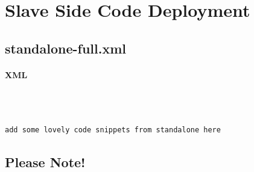 \documentclass[
10pt, %
letterpaper, %
oneside, %
headinclude,footinclude, %
BCOR5mm, %
]{scrartcl}
\begin{document}

\section{Slave Side Code Deployment}



\subsection{standalone-full.xml}


\paragraph{XML}~
\begin{lstlisting}[language=XML]

add some lovely code snippets from standalone here

\end{lstlisting}


\subsection{Please Note!}


\end{document}
